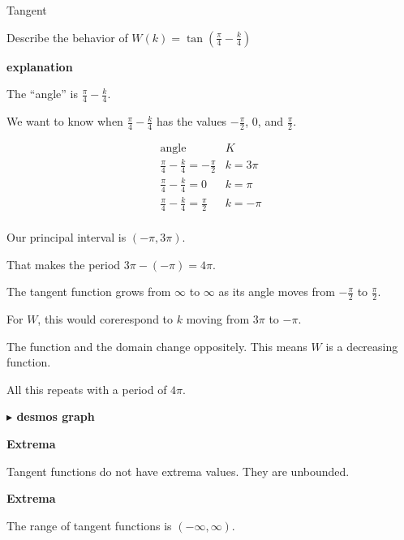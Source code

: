 \documentclass{ximera}
\begin{document}
\begin{example} Tangent

Describe the behavior of   $W(k) = \tan\left( \frac{\pi}{4} - \frac{k}{4} \right)$



\textbf{\textcolor{red!75!green}{explanation}} 



The ``angle'' is $\frac{\pi}{4} - \frac{k}{4}$.

We want to know when $\frac{\pi}{4} - \frac{k}{4}$ has the values $-\frac{\pi}{2}$, $0$, and $\frac{\pi}{2}$.






\[
\begin{array}{l|l}
\text{angle}                          & K  \\ \hline
\frac{\pi}{4} - \frac{k}{4} = -\frac{\pi}{2}        & k = 3 \pi  \\
\frac{\pi}{4} - \frac{k}{4} = 0               &  k = \pi \\
\frac{\pi}{4} - \frac{k}{4} = \frac{\pi}{2}   & k = -\pi  \\
\end{array}
\]






Our principal interval is $\left( -\pi, 3 \pi \right)$.

That makes the period $3 \pi - (-\pi) = 4 \pi$.




The tangent function grows from $\infty$ to $\infty$ as its angle moves from $-\frac{\pi}{2}$ to $\frac{\pi}{2}$.

For $W$, this would corerespond to $k$ moving from $3 \pi$ to $-\pi$.

The function and the domain change oppositely. This means $W$ is a decreasing function.



All this repeats with a period of $4 \pi$.












\textbf{\textcolor{blue!55!black}{$\blacktriangleright$ desmos graph}} 
\begin{center}
\end{center}






\textbf{\textcolor{blue!55!black}{Extrema}} 


Tangent functions do not have extrema values.  They are unbounded.




\textbf{\textcolor{blue!55!black}{Extrema}} 

The range of tangent functions is $(-\infty, \infty)$.


\end{example}
\end{document}
